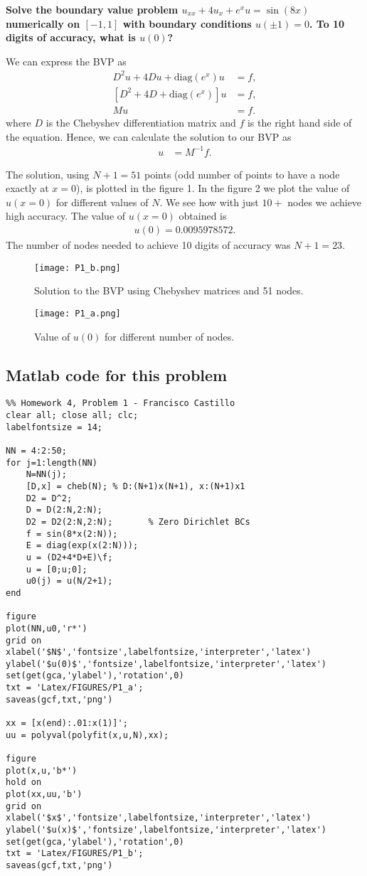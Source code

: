 \textbf{Solve the boundary value problem $u_{xx}+4u_{x}+e^xu=\sin{(8x)}$ numerically on $[-1,1]$ with boundary conditions $u(\pm1)=0$. To 10 digits of accuracy, what is $u(0)$?}
\newline

We can express the BVP as
\begin{align*}
D^2u+4Du+\text{diag}(e^x)u &= f,\\
\left[D^2+4D+\text{diag}(e^x)\right]u &= f,\\
Mu &= f.
\end{align*}
where $D$ is the Chebyshev differentiation matrix and $f$ is the right hand side of the equation. Hence, we can calculate the solution to our BVP as
\begin{align*}
u &= M^{-1}f.
\end{align*}

The solution, using $N+1=51$ points (odd number of points to have a node exactly at $x=0$), is plotted in the figure 1. In the figure 2 we plot the value of $u(x=0)$ for different values of $N$. We see how with just $10+$ nodes we achieve high accuracy. The value of $u(x=0)$ obtained is
\begin{align*}
u(0) =  0.0095978572.
\end{align*}
The number of nodes needed to achieve 10 digits of accuracy was $N+1 = 23$.
\begin{figure}[H]
\centering
\texttt{[image: P1\_b.png]}\caption{Solution to the BVP using Chebyshev matrices and 51 nodes.}
\end{figure}

\begin{figure}[H]
\centering
\texttt{[image: P1\_a.png]}\caption{Value of $u(0)$ for different number of nodes.}
\end{figure}

\subsection*{Matlab code for this problem}

\begin{verbatim}
%% Homework 4, Problem 1 - Francisco Castillo
clear all; close all; clc;
labelfontsize = 14;

NN = 4:2:50;
for j=1:length(NN)
    N=NN(j);
    [D,x] = cheb(N); % D:(N+1)x(N+1), x:(N+1)x1
    D2 = D^2;
    D = D(2:N,2:N);
    D2 = D2(2:N,2:N);       % Zero Dirichlet BCs
    f = sin(8*x(2:N));
    E = diag(exp(x(2:N)));
    u = (D2+4*D+E)\f;
    u = [0;u;0];
    u0(j) = u(N/2+1);
end

figure
plot(NN,u0,'r*')
grid on
xlabel('$N$','fontsize',labelfontsize,'interpreter','latex')
ylabel('$u(0)$','fontsize',labelfontsize,'interpreter','latex')
set(get(gca,'ylabel'),'rotation',0)
txt = 'Latex/FIGURES/P1_a';
saveas(gcf,txt,'png')

xx = [x(end):.01:x(1)]';
uu = polyval(polyfit(x,u,N),xx);

figure
plot(x,u,'b*')
hold on
plot(xx,uu,'b')
grid on
xlabel('$x$','fontsize',labelfontsize,'interpreter','latex')
ylabel('$u(x)$','fontsize',labelfontsize,'interpreter','latex')
set(get(gca,'ylabel'),'rotation',0)
txt = 'Latex/FIGURES/P1_b';
saveas(gcf,txt,'png')
\end{verbatim}